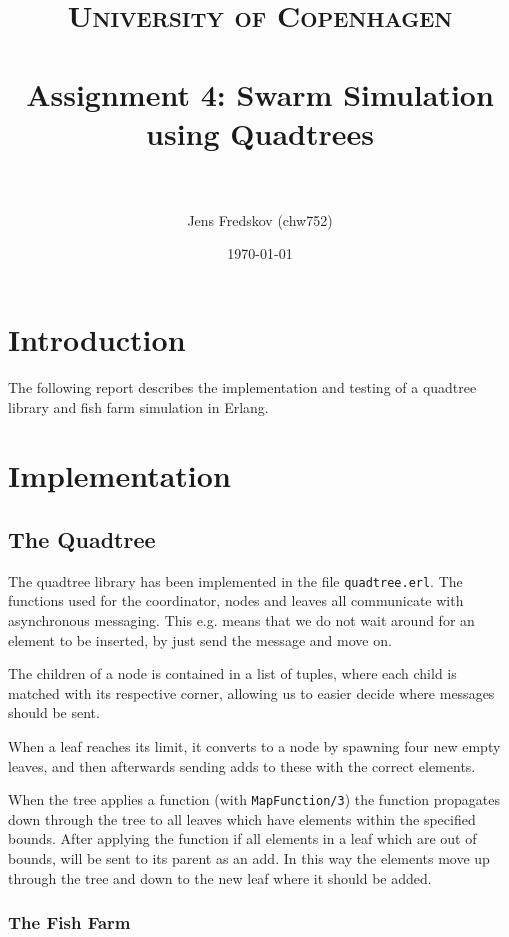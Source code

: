 \documentclass[a4paper, 11pt]{article}
\title{ 
\normalfont\normalsize 
\textsc{University of Copenhagen} \\ [25pt] %
\horrule{0.5pt} \\[0.4cm] %
\huge Assignment 4: Swarm Simulation using Quadtrees\\ %
\horrule{2pt} \\[0.5cm] %
}
\author{Jens Fredskov (chw752)} %
\date{\normalsize\today} %
\begin{document}
\maketitle

\section{Introduction} %
\label{sec:introduction}

The following report describes the implementation and testing of a quadtree library and fish farm simulation in Erlang.

\section{Implementation} %
\label{sec:implementation}

\subsection{The Quadtree} %
\label{sub:the_quadtree}

The quadtree library has been implemented in the file \texttt{quadtree.erl}. The functions used for the coordinator, nodes and leaves all communicate with asynchronous messaging. This e.g. means that we do not wait around for an element to be inserted, by just send the message and move on.

The children of a node is contained in a list of tuples, where each child is matched with its respective corner, allowing us to easier decide where messages should be sent.

When a leaf reaches its limit, it converts to a node by spawning four new empty leaves, and then afterwards sending adds to these with the correct elements.

When the tree applies a function (with \texttt{MapFunction/3}) the function propagates down through the tree to all leaves which have elements within the specified bounds. After applying the function if all elements in a leaf which are out of bounds, will be sent to its parent as an add. In this way the elements move up through the tree and down to the new leaf where it should be added.

\subsubsection{The Fish Farm} %
\label{ssub:the_fish_farm}
\end{document}
